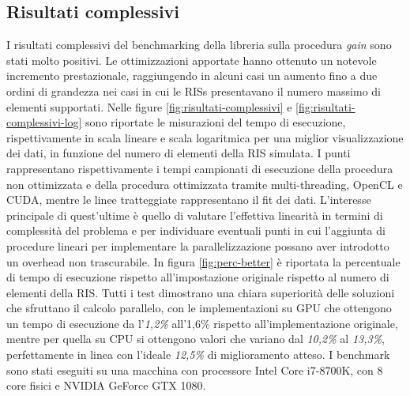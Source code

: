 \subsection{Risultati complessivi}
\label{subsec:risultati-complessivi}

I risultati complessivi del benchmarking della libreria sulla procedura \textit{gain}
sono stati molto positivi. Le ottimizzazioni apportate hanno ottenuto un notevole
incremento prestazionale, raggiungendo in alcuni casi un aumento fino a due
ordini di grandezza nei casi in cui le RISs presentavano il numero massimo di
elementi supportati. Nelle figure \ref{fig:risultati-complessivi} e \ref{fig:risultati-complessivi-log}
sono riportate le misurazioni del tempo di esecuzione, rispettivamente in scala
lineare e scala logaritmica per una miglior visualizzazione dei dati, in funzione
del numero di elementi della RIS simulata. I punti rappresentano rispettivamente
i tempi campionati di esecuzione della procedura non ottimizzata e della
procedura ottimizzata tramite multi-threading, OpenCL e CUDA, mentre le linee
tratteggiate rappresentano il fit dei dati. L'interesse principale di quest'ultime
è quello di valutare l'effettiva linearità in termini di complessità del problema
e per individuare eventuali punti in cui l'aggiunta di procedure lineari per implementare
la parallelizzazione possano aver introdotto un overhead non trascurabile. In
figura \ref{fig:perc-better} è riportata la percentuale di tempo di esecuzione
rispetto all'impostazione originale rispetto al numero di elementi della RIS. Tutti
i test dimostrano una chiara superiorità delle soluzioni che sfruttano il calcolo
parallelo, con le implementazioni su GPU che ottengono un tempo di esecuzione da
l'\textit{1,2\%} all'{1,6\%} rispetto all'implementazione originale, mentre per
quella su CPU si ottengono valori che variano dal \textit{10,2\%} al \textit{13,3\%},
perfettamente in linea con l'ideale \textit{12,5\%} di miglioramento atteso. I benchmark
sono stati eseguiti su una macchina con processore Intel Core i7-8700K, con 8
core fisici e NVIDIA GeForce GTX 1080.

